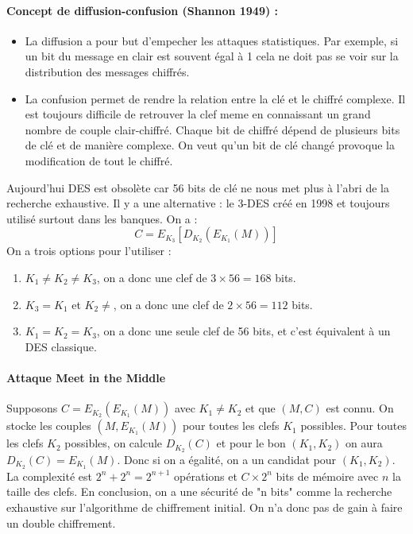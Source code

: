 \documentclass[12pt,a4paper]{report}
\begin{document}
\paragraph{Concept de diffusion-confusion (Shannon 1949) :\\}
\begin{itemize}
\item La diffusion a pour but d'empecher les attaques statistiques. Par exemple, si un bit du message en clair est souvent égal à 1 cela ne doit pas se voir sur la distribution des messages chiffrés.
\item La confusion permet de rendre la relation entre la clé et le chiffré complexe. Il est toujours difficile de retrouver la clef meme en connaissant un grand nombre de couple clair-chiffré. Chaque bit de chiffré dépend de plusieurs bits de clé et de manière complexe. On veut qu'un bit de clé changé provoque la modification de tout le chiffré.
\end{itemize}

Aujourd'hui DES est obsolète car 56 bits de clé ne nous met plus à l'abri de la recherche exhaustive. Il y a une alternative : le 3-DES créé en 1998 et toujours utilisé surtout dans les banques.
On a :
$$ C = E_{K_3} \left[ D_{K_2} \left(E_{K_1}(M)\right)\right] $$
On a trois options pour l'utiliser :
\begin{enumerate}
\item $K_1 \neq K_2 \neq K_3$, on a donc une clef de $3\times 56 = 168$ bits.
\item $K_3 = K_1$ et $K_2 \neq$, on a donc une clef de $2\times 56 = 112$ bits.
\item $K_1=K_2=K_3$, on a donc une seule clef de 56 bits, et c'est équivalent à un DES classique.
\end{enumerate}
\paragraph{Attaque Meet in the Middle\\}
Supposons $C=E_{K_2}(E_{K_1}(M))$ avec $K_1 \neq K_2$ et que $(M,C)$ est connu. On stocke les couples $(M,E_{K_1}(M))$ pour toutes les clefs $K_1$ possibles. Pour toutes les clefs $K_2$ possibles, on calcule $D_{K_2}(C)$ et pour le bon $(K_1,K_2)$ on aura $D_{K_2}(C) = E_{K_1}(M)$. Donc si on a égalité, on a un candidat pour $(K_1,K_2)$. La complexité est $2^n+2^n = 2^{n+1}$ opérations et $C\times 2^n$ bits de mémoire avec $n$ la taille des clefs. En conclusion, on a une sécurité de "n bits" comme la recherche exhaustive sur l'algorithme de chiffrement initial. On n'a donc pas de gain à faire un double chiffrement.
\end{document}
